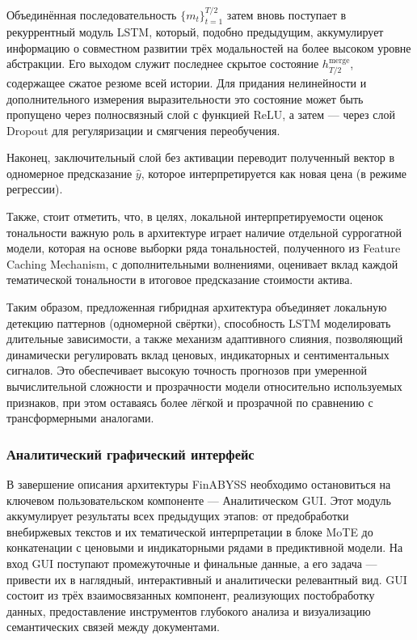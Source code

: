 Объединённая последовательность $\{m_t\}_{t=1}^{T/2}$ затем вновь поступает в рекуррентный модуль
LSTM, который, подобно предыдущим, аккумулирует информацию о совместном развитии трёх модальностей
на более высоком уровне абстракции. Его выходом служит последнее скрытое состояние
$h_{T/2}^{\mathrm{merge}}$, содержащее сжатое резюме всей истории. Для придания нелинейности
и дополнительного измерения выразительности это состояние может быть пропущено через полносвязный
слой с функцией $\mathrm{ReLU}$, а затем — через слой Dropout для регуляризации и смягчения переобучения.

Наконец, заключительный слой без активации переводит полученный вектор в одномерное предсказание
$\hat y$, которое интерпретируется как новая цена (в режиме регрессии).

Также, стоит отметить, что, в целях, локальной интерпретируемости оценок тональности важную роль
в архитектуре играет наличие отдельной суррогатной модели, которая на основе выборки ряда
тональностей, полученного из Feature Caching Mechanism, с дополнительными волнениями,
оценивает вклад каждой тематической тональности в итоговое предсказание стоимости актива.

Таким образом, предложенная гибридная архитектура объединяет локальную детекцию паттернов
(одномерной свёртки), способность LSTM моделировать длительные зависимости, а также механизм
адаптивного слияния, позволяющий динамически регулировать вклад ценовых, индикаторных и сентиментальных
сигналов. Это обеспечивает высокую точность прогнозов при умеренной вычислительной сложности
и прозрачности модели относительно используемых признаков, при этом оставаясь более лёгкой
и прозрачной по сравнению с трансформерными аналогами.

\subsubsection{Аналитический графический интерфейс}
\label{sec:gui}
В завершение описания архитектуры FinABYSS необходимо остановиться на ключевом пользовательском компоненте ---
Аналитическом GUI. Этот модуль аккумулирует результаты всех предыдущих этапов:
от предобработки внебиржевых текстов и их тематической интерпретации в блоке MoTE до конкатенации
с ценовыми и индикаторными рядами в предиктивной модели. На вход GUI поступают промежуточные и финальные данные,
а его задача --- привести их в наглядный, интерактивный и аналитически релевантный вид. GUI состоит
из трёх взаимосвязанных компонент, реализующих постобработку данных, предоставление инструментов
глубокого анализа и визуализацию семантических связей между документами.

